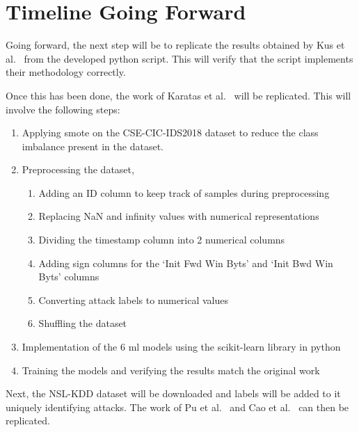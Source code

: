 \chapter{Timeline Going Forward}%
\label{chp:timeline}

Going forward, the next step will be to replicate the results obtained by Kus
et al.~\cite{Kus} from the developed python script. This will verify that the
script implements their methodology correctly.

Once this has been done, the work of Karatas et al.~\cite{Karatas} will be
replicated. This will involve the following steps:
\begin{enumerate}
      \item Applying \gls{smote} on the CSE-CIC-IDS2018 dataset to reduce the class
            imbalance present in the dataset.
      \item Preprocessing the dataset,
            \begin{enumerate}
                  \item Adding an ID column to keep track of samples during preprocessing
                  \item Replacing NaN and infinity values with numerical representations
                  \item Dividing the timestamp column into 2 numerical columns
                  \item Adding sign columns for the `Init Fwd Win Byts' and `Init Bwd Win Byts' columns
                  \item Converting attack labels to numerical values
                  \item Shuffling the dataset
            \end{enumerate}
      \item Implementation of the 6 \gls{ml} models using the scikit-learn library in
            python
      \item Training the models and verifying the results match the original work
\end{enumerate}

Next, the NSL-KDD dataset will be downloaded and labels will be added to it
uniquely identifying attacks. The work of Pu et al.~\cite{Pu} and Cao et
al.~\cite{Cao} can then be replicated.

